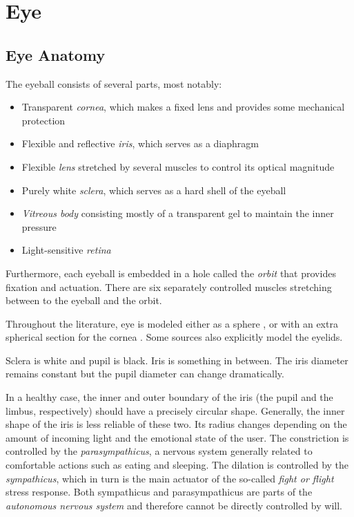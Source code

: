 \section{Eye}
\subsection{Eye Anatomy}
\label{s.eyeanatomy}

The eyeball consists of several parts, most notably:
\begin{itemize}
\item Transparent \textit{cornea}, which makes a fixed lens and provides some mechanical protection
\item Flexible and reflective \textit{iris}, which serves as a diaphragm
\item Flexible \textit{lens} stretched by several muscles to control its optical magnitude
\item Purely white \textit{sclera}, which serves as a hard shell of the eyeball
\item \textit{Vitreous body} consisting mostly of a transparent gel to maintain the inner pressure
\item Light-sensitive \textit{retina}
\end{itemize}

Furthermore, each eyeball is embedded in a hole called the \textit{orbit} that provides fixation and actuation.
There are six separately controlled muscles stretching between to the eyeball and the orbit.

Throughout the literature, eye is modeled either as a sphere \cite{zhang13}, or with an extra spherical section for the cornea \cite{villanueva08}.
Some sources also explicitly model the eyelids.

Sclera is white and pupil is black.
Iris is something in between.
The iris diameter remains constant but the pupil diameter can change dramatically.

In a healthy case, the inner and outer boundary of the iris (the pupil and the limbus, respectively) should have a precisely circular shape.
Generally, the inner shape of the iris is less reliable of these two.
Its radius changes depending on the amount of incoming light and the emotional state of the user.
The constriction is controlled by the \textit{parasympathicus}, a nervous system generally related to comfortable actions such as eating and sleeping.
The dilation is controlled by the \textit{sympathicus}, which in turn is the main actuator of the so-called \textit{fight or flight} stress response.
Both sympathicus and parasympathicus are parts of the \textit{autonomous nervous system} and therefore cannot be directly controlled by will.

